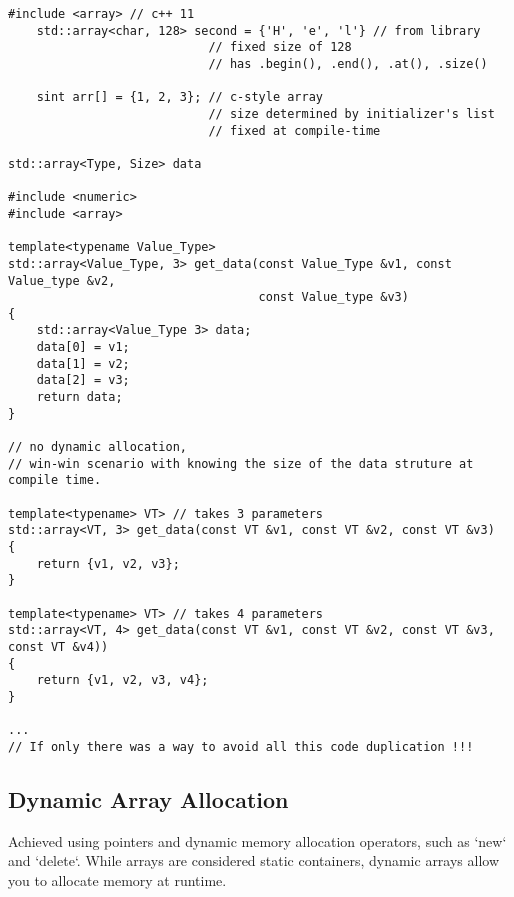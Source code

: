 \begin{verbatim}
#include <array> // c++ 11
    std::array<char, 128> second = {'H', 'e', 'l'} // from library
                            // fixed size of 128
                            // has .begin(), .end(), .at(), .size() 

    sint arr[] = {1, 2, 3}; // c-style array 
                            // size determined by initializer's list
                            // fixed at compile-time 

std::array<Type, Size> data

#include <numeric>
#include <array>

template<typename Value_Type>
std::array<Value_Type, 3> get_data(const Value_Type &v1, const Value_type &v2,
                                   const Value_type &v3)
{
    std::array<Value_Type 3> data;
    data[0] = v1;
    data[1] = v2;
    data[2] = v3;
    return data;
}

// no dynamic allocation, 
// win-win scenario with knowing the size of the data struture at compile time.

template<typename> VT> // takes 3 parameters
std::array<VT, 3> get_data(const VT &v1, const VT &v2, const VT &v3)
{
    return {v1, v2, v3};
}

template<typename> VT> // takes 4 parameters
std::array<VT, 4> get_data(const VT &v1, const VT &v2, const VT &v3, const VT &v4))
{
    return {v1, v2, v3, v4};
}

... 
// If only there was a way to avoid all this code duplication !!!
\end{verbatim}

\subsection{Dynamic Array Allocation}

Achieved using pointers and dynamic memory allocation operators, such as `new` and `delete`. 
While arrays are considered static containers,
dynamic arrays allow you to allocate memory at runtime.

